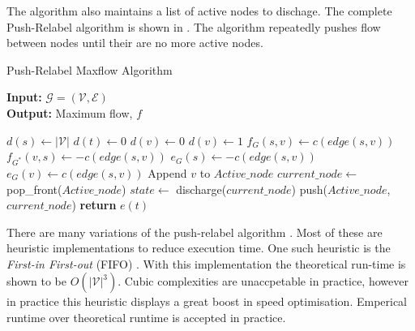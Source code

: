 The algorithm also maintains a list of active nodes to dischage. The complete Push-Relabel algorithm is shown in . The algorithm repeatedly pushes flow between nodes until their are no more active nodes.

\begin{algorithm}[!t]
	\caption{Push-Relabel Maxflow Algorithm}\label{alg:pushrelabelcomplete}
	\textbf{Input:} $\mathcal{G}=(\mathcal{V},\mathcal{E})$\\
	\textbf{Output:} Maximum flow, $f$
	\begin{algorithmic}[1]
		\State $d(s) \gets |\mathcal{V}|$
		\State $d(t) \gets 0$
		\State $d(v) \gets 0$
		\EndFor
		\State $d(v) \gets 1$
		\State $f_{G}(s,v) \gets c(edge (s,v))$
		\State $f_{G^*}(v,s) \gets -c(edge (s,v))$
		\State $e_G(s) \gets -c(edge (s,v))$
		\State $e_G(v) \gets c(edge (s,v))$
		\State Append $v$ to $Active\_node$
		\EndFor
		\State $current\_node \gets$ pop\_front($Active\_node$)
		\State $state \gets$ discharge($current\_node$)
		\State push($Active\_node$,$current\_node$)
		\EndIf
		\EndWhile
		\State \textbf{return} $e(t)$
		\EndProcedure
	\end{algorithmic}
\end{algorithm}

There are many variations of the push-relabel algorithm \citep{Cherkassky1997,Goldberg1988}. Most of these are heuristic implementations to reduce execution time. One such heuristic is the \textit{First-in First-out} (FIFO) \citep{Goldberg1988}. With this implementation the theoretical run-time is shown to be $O(|\mathcal{V}|^3)$. Cubic complexities are unaccpetable in practice, however in practice this heuristic displays a great boost in speed optimisation. Emperical runtime over theoretical runtime is accepted in practice. 

